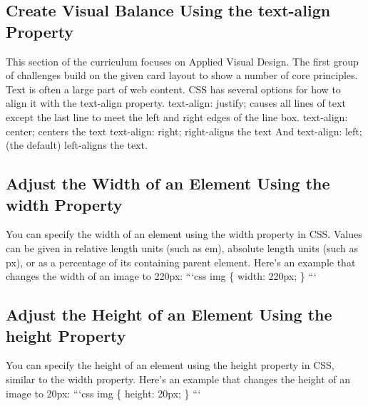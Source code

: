 \documentclass{article}%
\begin{document}
\subsection{Create Visual Balance Using the text{-}align Property}%
\label{subsec:CreateVisualBalanceUsingthetext{-}alignProperty}%
This section of the curriculum focuses on Applied Visual Design. The first group of challenges build on the given card layout to show a number of core principles.\newline%
Text is often a large part of web content. CSS has several options for how to align it with the text{-}align property.\newline%
text{-}align: justify; causes all lines of text except the last line to meet the left and right edges of the line box.\newline%
text{-}align: center; centers the text\newline%
text{-}align: right; right{-}aligns the text\newline%
And text{-}align: left; (the default) left{-}aligns the text.\newline%

%
\subsection{Adjust the Width of an Element Using the width Property}%
\label{subsec:AdjusttheWidthofanElementUsingthewidthProperty}%
You can specify the width of an element using the width property in CSS. Values can be given in relative length units (such as em), absolute length units (such as px), or as a percentage of its containing parent element. Here's an example that changes the width of an image to 220px:\newline%
```css\newline%
img \{\newline%
  width: 220px;\newline%
\}\newline%
```\newline%

%
\subsection{Adjust the Height of an Element Using the height Property}%
\label{subsec:AdjusttheHeightofanElementUsingtheheightProperty}%
You can specify the height of an element using the height property in CSS, similar to the width property. Here's an example that changes the height of an image to 20px:\newline%
```css\newline%
img \{\newline%
  height: 20px;\newline%
\}\newline%
```\newline%
\end{document}
